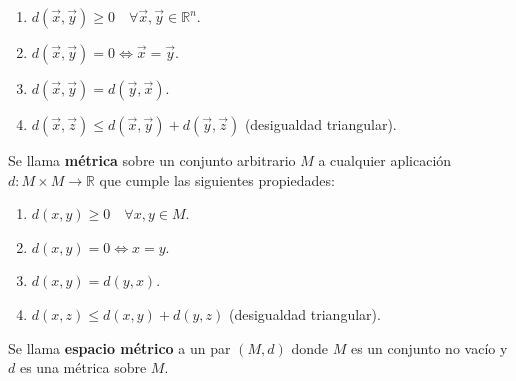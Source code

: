 \begin{proposición}
    \begin{enumerate}
        \item $d(\vec{x}, \vec{y}) \geq 0 \quad \forall \vec{x}, \vec{y} \in \mathbb{R}^n$.
        \item $d(\vec{x}, \vec{y}) = 0 \Leftrightarrow \vec{x} = \vec{y}$.
        \item $d(\vec{x}, \vec{y}) = d(\vec{y}, \vec{x})$.
        \item $d(\vec{x}, \vec{z}) \leq d(\vec{x}, \vec{y}) + d(\vec{y}, \vec{z})$ (desigualdad triangular).
    \end{enumerate}
\end{proposición}

\begin{definición}[Métrica]
    Se llama \textbf{métrica} sobre un conjunto arbitrario $M$ a cualquier aplicación $d: M \times M \to \mathbb{R}$ que cumple las siguientes propiedades:
    \begin{enumerate}
        \item $d(x, y) \geq 0 \quad \forall x, y \in M$.
        \item $d(x, y) = 0 \Leftrightarrow x = y$.
        \item $d(x, y) = d(y, x)$.
        \item $d(x, z) \leq d(x, y) + d(y, z)$ (desigualdad triangular).
    \end{enumerate}
\end{definición}

\begin{definición}
    Se llama \textbf{espacio métrico} a un par $(M, d)$ donde $M$ es un conjunto no vacío y $d$ es una métrica sobre $M$.
\end{definición}


